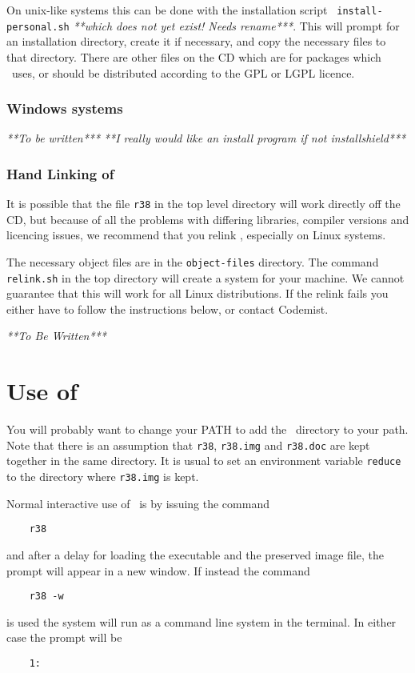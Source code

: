 On unix-like systems this can be done with the installation script {\tt
  install-personal.sh} {\em ***which does not yet exist! Needs rename***}.
  This will prompt for an installation directory, create it if
  necessary, and copy the necessary files to that directory.  There
  are other files on the CD which are for packages which \REDUCE\ uses,
  or should be distributed according to the GPL or LGPL licence. 

\subsubsection{Windows systems}

{\em ***To be written***}
{\em ***I really would like an install program if not installshield***}


\subsubsection{Hand Linking of \REDUCE\ }

It is possible that the file {\tt r38} in the top level directory
will work directly off the CD, but because of all the problems with
differing libraries, compiler versions and licencing issues, we
recommend that you relink \REDUCE, especially on Linux systems.

The necessary object files are in the {\tt object-files}
directory.  The command {\tt relink.sh} in the top directory will
create a system for your machine.  We cannot guarantee that this will
work for all Linux distributions.  If the relink fails you either have
to follow the instructions below, or contact Codemist.

{\em ***To Be Written***}

\section{Use of \REDUCE\ }

You will probably want to change your PATH to add the \REDUCE\  directory
to your path.  Note that there is an assumption that {\tt r38},
{\tt r38.img} and {\tt r38.doc} are kept together in the same
directory.  It is usual to set an environment variable {\tt reduce} to
the directory where {\tt r38.img} is kept.

Normal interactive use of \REDUCE\ is by issuing the command
\begin{verbatim}
	r38
\end{verbatim}
and after a delay for loading the executable and the preserved image
file, the prompt will appear in a new window.  If instead the command 
\begin{verbatim}
	r38 -w
\end{verbatim}
is used the system will run as a command line system in the terminal.
In either case the prompt will be
\begin{verbatim}
	1:
\end{verbatim}

